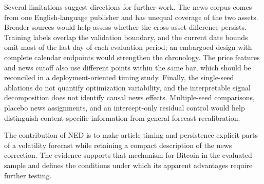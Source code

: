 Several limitations suggest directions for further work. The news
corpus comes from one English-language publisher and has unequal
coverage of the two assets. Broader sources would help assess whether
the cross-asset difference persists. Training labels overlap the
validation boundary, and the current date bounds omit most of the
last day of each evaluation period; an embargoed design with complete
calendar endpoints would strengthen the chronology. The price features
and news cutoff also use different points within the same bar, which
should be reconciled in a deployment-oriented timing study. Finally,
the single-seed ablations do not quantify optimization variability,
and the interpretable signal decomposition does not identify causal
news effects. Multiple-seed comparisons, placebo news assignments,
and an intercept-only residual control would help distinguish
content-specific information from general forecast recalibration.

The contribution of NED is to make article timing and persistence
explicit parts of a volatility forecast while retaining a compact
description of the news correction. The evidence supports that
mechanism for Bitcoin in the evaluated sample and defines the
conditions under which its apparent advantages require further
testing.
